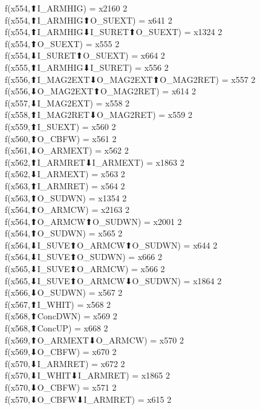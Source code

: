 f(x554,⬆I_ARMHIG) = x2160 {2} \\
f(x554,⬆I_ARMHIG⬆O_SUEXT) = x641 {2} \\
f(x554,⬆I_ARMHIG⬇I_SURET⬆O_SUEXT) = x1324 {2} \\
f(x554,⬆O_SUEXT) = x555 {2} \\
f(x554,⬇I_SURET⬆O_SUEXT) = x664 {2} \\
f(x555,⬆I_ARMHIG⬇I_SURET) = x556 {2} \\
f(x556,⬆I_MAG2EXT⬇O_MAG2EXT⬆O_MAG2RET) = x557 {2} \\
f(x556,⬇O_MAG2EXT⬆O_MAG2RET) = x614 {2} \\
f(x557,⬇I_MAG2EXT) = x558 {2} \\
f(x558,⬆I_MAG2RET⬇O_MAG2RET) = x559 {2} \\
f(x559,⬆I_SUEXT) = x560 {2} \\
f(x560,⬆O_CBFW) = x561 {2} \\
f(x561,⬇O_ARMEXT) = x562 {2} \\
f(x562,⬆I_ARMRET⬇I_ARMEXT) = x1863 {2} \\
f(x562,⬇I_ARMEXT) = x563 {2} \\
f(x563,⬆I_ARMRET) = x564 {2} \\
f(x563,⬆O_SUDWN) = x1354 {2} \\
f(x564,⬆O_ARMCW) = x2163 {2} \\
f(x564,⬆O_ARMCW⬆O_SUDWN) = x2001 {2} \\
f(x564,⬆O_SUDWN) = x565 {2} \\
f(x564,⬇I_SUVE⬆O_ARMCW⬆O_SUDWN) = x644 {2} \\
f(x564,⬇I_SUVE⬆O_SUDWN) = x666 {2} \\
f(x565,⬇I_SUVE⬆O_ARMCW) = x566 {2} \\
f(x565,⬇I_SUVE⬆O_ARMCW⬇O_SUDWN) = x1864 {2} \\
f(x566,⬇O_SUDWN) = x567 {2} \\
f(x567,⬆I_WHIT) = x568 {2} \\
f(x568,⬆ConcDWN) = x569 {2} \\
f(x568,⬆ConcUP) = x668 {2} \\
f(x569,⬆O_ARMEXT⬇O_ARMCW) = x570 {2} \\
f(x569,⬇O_CBFW) = x670 {2} \\
f(x570,⬇I_ARMRET) = x672 {2} \\
f(x570,⬇I_WHIT⬇I_ARMRET) = x1865 {2} \\
f(x570,⬇O_CBFW) = x571 {2} \\
f(x570,⬇O_CBFW⬇I_ARMRET) = x615 {2} \\

